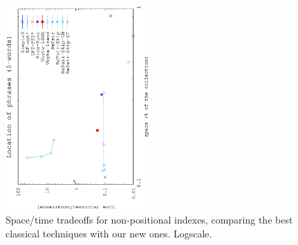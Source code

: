 \documentclass[review]{elsarticle}
\begin{document}
\begin{figure}[t]
\begin{center}
\includegraphics[angle=-90,width=0.49\textwidth]{../figures/f2/phrases5-5/nonpos-5_5.eps}
\caption{Space/time tradeoffs for non-positional indexes, comparing the best
classical techniques with our new ones. Logscale.}
\label{fig:nonpos2}
\end{center}
\end{figure}
\end{document}
